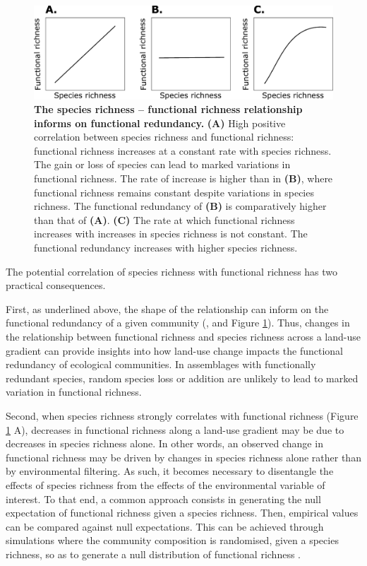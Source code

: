 \begin{figure}[h!]
\centering
\includegraphics[scale=0.7]{figures/chapter1/FRedundancy}
\caption[The species richness -- functional richness relationship informs on functional redundancy.]{\textbf{The species richness -- functional richness relationship informs on functional redundancy.} \textbf{(A)} High positive correlation between species richness and functional richness: functional richness increases at a constant rate with species richness. The gain or loss of species can lead to marked variations in functional richness. The rate of increase is higher than in \textbf{(B)}, where functional richness remains constant despite variations in species richness. The functional redundancy of \textbf{(B)} is comparatively higher than that of \textbf{(A)}. \textbf{(C)} The rate at which functional richness increases with increases in species richness is not constant. The functional redundancy increases with higher species richness.} 
\label{fredundancy_ltr}
\end{figure}

The potential correlation of species richness with functional richness has two practical consequences. 

First, as underlined above, the shape of the relationship can inform on the functional redundancy of a given community (\cite{Cadotte2011}, and Figure \ref{fredundancy_ltr}). Thus, changes in the relationship between functional richness and species richness across a land-use gradient can provide insights into how land-use change impacts the functional redundancy of ecological communities. In assemblages with functionally redundant species, random species loss or addition are unlikely to lead to marked variation in functional richness.

Second, when species richness strongly correlates with functional richness (Figure \ref{fredundancy_ltr} A), decreases in functional richness along a land-use gradient may be due to decreases in species richness alone. In other words, an observed change in functional richness may be driven by changes in species richness alone rather than by environmental filtering. As such, it becomes necessary to disentangle the effects of species richness from the effects of the environmental variable of interest. To that end, a common approach consists in generating the null expectation of functional richness given a species richness. Then, empirical values can be compared against null expectations. This can be achieved through simulations where the community composition is randomised, given a species richness, so as to generate a null distribution of functional richness \citep{Wong2018, Flynn2009}.

